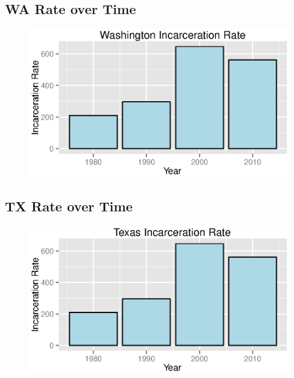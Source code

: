 \documentclass{exam}
\begin{document}
  \subsection{WA Rate over Time}
  \begin{figure}[H]
    \centering
    \includegraphics[scale = 0.9]{wa_rate.eps}
  \end{figure}

  \subsection{TX Rate over Time}
  \begin{figure}[H]
    \centering
    \includegraphics[scale = 0.9]{tx_rate.eps}
  \end{figure}
\end{document}
